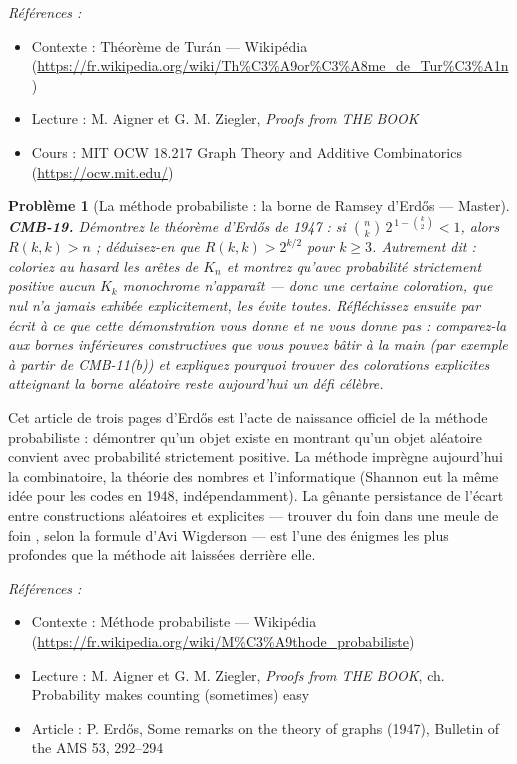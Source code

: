 \documentclass[11pt]{article}
\newtheorem{problem}{Problème}
\newenvironment{refs}{\par\small\noindent\emph{Références :}\begin{itemize}\setlength\itemsep{0pt}}{\end{itemize}\normalsize}
\begin{document}
\begin{refs}
\item Contexte : Théorème de Turán --- Wikipédia (\url{https://fr.wikipedia.org/wiki/Th%C3%A9or%C3%A8me_de_Tur%C3%A1n})
\item Lecture : M. Aigner et G. M. Ziegler, \textit{Proofs from THE BOOK}
\item Cours : MIT OCW 18.217 Graph Theory and Additive Combinatorics (\url{https://ocw.mit.edu/})
\end{refs}

\bigskip

\begin{problem}[{La méthode probabiliste : la borne de Ramsey d'Erd\H{o}s --- Master}]
\textbf{CMB-19.} Démontrez le théorème d'Erd\H{o}s de 1947 : si
$ \binom{n}{k} \, 2^{\,1 - \binom{k}{2}} < 1 $, alors $ R(k,k) > n $ ; déduisez-en que
$ R(k,k) > 2^{k/2} $ pour $ k \ge 3 $. Autrement dit : coloriez au hasard les arêtes de
$ K_n $ et montrez qu'avec probabilité strictement positive aucun $ K_k $ monochrome
n'apparaît --- donc une certaine coloration, que nul n'a jamais exhibée explicitement, les évite
toutes. Réfléchissez ensuite par écrit à ce que cette démonstration vous donne et ne vous donne
pas : comparez-la aux bornes inférieures constructives que vous pouvez bâtir à la main (par
exemple à partir de CMB-11(b)) et expliquez pourquoi trouver des colorations explicites atteignant
la borne aléatoire reste aujourd'hui un défi célèbre.
\end{problem}

\noindent Cet article de trois pages d'Erd\H{o}s est l'acte de naissance officiel de la
méthode probabiliste : démontrer qu'un objet existe en montrant qu'un objet aléatoire convient
avec probabilité strictement positive. La méthode imprègne aujourd'hui la combinatoire, la théorie
des nombres et l'informatique (Shannon eut la même idée pour les codes en 1948, indépendamment).
La gênante persistance de l'écart entre constructions aléatoires et explicites --- \og{} trouver du foin
dans une meule de foin \fg{}, selon la formule d'Avi Wigderson --- est l'une des énigmes les plus
profondes que la méthode ait laissées derrière elle.

\begin{refs}
\item Contexte : Méthode probabiliste --- Wikipédia (\url{https://fr.wikipedia.org/wiki/M%C3%A9thode_probabiliste})
\item Lecture : M. Aigner et G. M. Ziegler, \textit{Proofs from THE BOOK}, ch. \og{} Probability makes counting (sometimes) easy \fg{}
\item Article : P. Erd\H{o}s, \og{} Some remarks on the theory of graphs \fg{} (1947), Bulletin of the AMS 53, 292--294
\end{refs}
\end{document}
